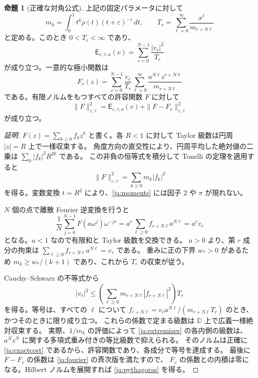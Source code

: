 \documentclass[12pt]{amsart}
\theoremstyle{definition}
\theoremstyle{remark}
\numberwithin{equation}{section}
\newcommand{\D}{\mathbb{D}}
\newcommand{\Cost}{\mathsf E}
\theoremstyle{definition}
\newtheorem{jprop}[thm]{命題}
\begin{document}
\begin{jprop}[正確な対角公式]\label{ja:exact}
上記の固定パラメータに対して
\begin{equation}\label{ja:moments}
 m_k=\int_0^1t^k\rho(t)(t+\varepsilon)^{-c}\,dt,
 \qquad
 T_r=\sum_{\ell=0}^{\infty}\frac{x^\ell}{m_{r+N\ell}}
\end{equation}
と定める。このとき $0<T_r<\infty$ であり、
\begin{equation}\label{ja:exactcost}
 \Cost_{\varepsilon,\tau,a}(v)=\sum_{r=0}^{N-1}\frac{|v_r|^2}{T_r}
\end{equation}
が成り立つ。一意的な極小関数は
\begin{equation}\label{ja:extremizer}
 F_v(z)=\sum_{r=0}^{N-1}\frac{v_r}{T_r}
 \sum_{\ell=0}^{\infty}
 \frac{a^{N\ell}z^{r+N\ell}}{m_{r+N\ell}}
\end{equation}
である。有限ノルムをもつすべての許容関数 $F$ に対して
\begin{equation}\label{ja:pythagoras}
 \|F\|_{\varepsilon,\tau}^2
 =\Cost_{\varepsilon,\tau,a}(v)+\|F-F_v\|_{\varepsilon,\tau}^2
\end{equation}
が成り立つ。
\end{jprop}
\begin{proof}[証明]
$F(z)=\sum_{k\ge0}f_kz^k$ と書く。各 $R<1$ に対して Taylor 級数は円周 $|z|=R$ 上で一様収束する。
角度方向の直交性により、円周平均した絶対値の二乗は $\sum_k|f_k|^2R^{2k}$ である。
この非負の恒等式を積分して Tonelli の定理を適用すると
\begin{equation}\label{ja:parseval}
 \|F\|_{\varepsilon,\tau}^2=\sum_{k\ge0}m_k|f_k|^2
\end{equation}
を得る。変数変換 $t=R^2$ により、\eqref{ja:moments} には因子 $2$ や $\pi$ が現れない。

$N$ 個の点で離散 Fourier 逆変換を行うと
\begin{equation}\label{ja:fourier}
 \frac1N\sum_{j=0}^{N-1}F(a\omega^j)\omega^{-jr}
 =a^r\sum_{\ell\ge0}f_{r+N\ell}a^{N\ell}=a^rv_r
\end{equation}
となる。$a<1$ なので有限和と Taylor 級数を交換できる。
$a>0$ より、第 $r$ 成分の拘束は
$\sum_{\ell\ge0}f_{r+N\ell}a^{N\ell}=v_r$ である。
重みに正の下界 $w_*>0$ があるため $m_k\ge w_* /(k+1)$ であり、これから $T_r$ の収束が従う。

Cauchy--Schwarz の不等式から
\[
 |v_r|^2\le
 \left(\sum_{\ell\ge0}m_{r+N\ell}|f_{r+N\ell}|^2\right)T_r
\]
を得る。等号は、すべての $\ell$ について
$f_{r+N\ell}=v_ra^{N\ell}/(m_{r+N\ell}T_r)$ のとき、かつそのときに限り成り立つ。
これらの係数で定まる級数は $\D$ 上で広義一様絶対収束する。
実際、$1/m_k$ の評価によって \eqref{ja:extremizer} の各内側の級数は、
$a^Nz^N$ に関する多項式重み付きの等比級数で抑えられる。
そのノルムは正確に \eqref{ja:exactcost} であるから、許容関数であり、各成分で等号を達成する。
最後に $F-F_v$ の係数は \eqref{ja:fourier} の斉次版を満たすので、
$F_v$ の係数との内積は零になる。Hilbert ノルムを展開すれば \eqref{ja:pythagoras} を得る。
\end{proof}
\end{document}
